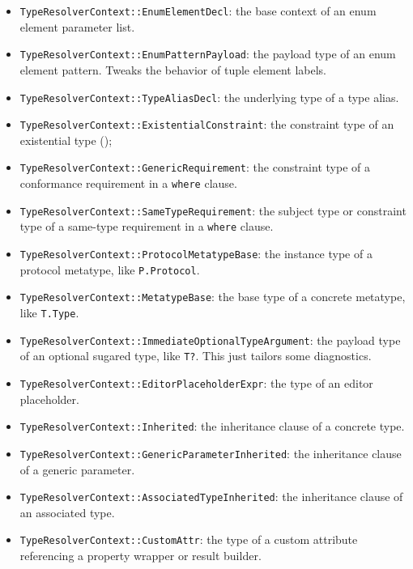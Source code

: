 \documentclass[../generics]{subfiles}
\begin{document}
\begin{itemize}
\item \texttt{TypeResolverContext::EnumElementDecl}: the base context of an enum element parameter list.
\item \texttt{TypeResolverContext::EnumPatternPayload}: the payload type of an enum element pattern. Tweaks the behavior of tuple element labels.
\item \texttt{TypeResolverContext::TypeAliasDecl}: the underlying type of a type alias.
\item \texttt{TypeResolverContext::ExistentialConstraint}: the constraint type of an existential type ();
\item \texttt{TypeResolverContext::GenericRequirement}: the constraint type of a conformance requirement in a \texttt{where} clause.
\item \texttt{TypeResolverContext::SameTypeRequirement}: the subject type or constraint type of a same-type requirement in a \texttt{where} clause.
\item \texttt{TypeResolverContext::ProtocolMetatypeBase}: the instance type of a protocol metatype, like \texttt{P.Protocol}.
\item \texttt{TypeResolverContext::MetatypeBase}: the base type of a concrete metatype, like \texttt{T.Type}.
\item \texttt{TypeResolverContext::ImmediateOptionalTypeArgument}: the payload type of an optional sugared type, like \texttt{T?}. This just tailors some diagnostics.
\item \texttt{TypeResolverContext::EditorPlaceholderExpr}: the type of an editor placeholder.
\item \texttt{TypeResolverContext::Inherited}: the inheritance clause of a concrete type.
\item \texttt{TypeResolverContext::GenericParameterInherited}: the inheritance clause of a generic parameter.
\item \texttt{TypeResolverContext::AssociatedTypeInherited}: the inheritance clause of an associated type.
\item \texttt{TypeResolverContext::CustomAttr}: the type of a custom attribute referencing a property wrapper or result builder.
\end{itemize}
\end{document}
